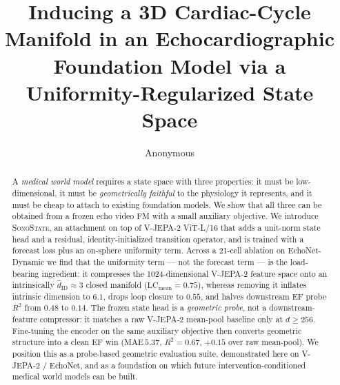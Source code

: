 \documentclass[runningheads]{llncs}
\newcommand{\sonostate}{\textsc{SonoState}\xspace}
\begin{document}
\title{Inducing a 3D Cardiac-Cycle Manifold in an Echocardiographic
Foundation Model via a Uniformity-Regularized State Space}

\author{Anonymous}

\maketitle

\begin{abstract}
A \emph{medical world model} requires a state space with three properties:
it must be low-dimensional, it must be \emph{geometrically faithful} to the
physiology it represents, and it must be cheap to attach to existing
foundation models. We show that all three can be obtained from a frozen
echo video FM with a small auxiliary objective. We introduce \sonostate,
an attachment on top of V-JEPA-2 ViT-L/16 that adds a unit-norm state head
and a residual, identity-initialized transition operator, and is trained
with a forecast loss plus an on-sphere uniformity term. Across a 21-cell
ablation on EchoNet-Dynamic we find that the uniformity term --- not the
forecast term --- is the load-bearing ingredient: it compresses the
1024-dimensional V-JEPA-2 feature space onto an intrinsically
$\widehat{d}_\mathrm{ID}\!\approx\!3$ closed manifold ($\mathrm{LC}_\mathrm{mean}\!=\!0.75$),
whereas removing it inflates intrinsic dimension to $6.1$, drops loop
closure to $0.55$, and halves downstream EF probe $R^2$ from $0.48$ to
$0.14$. The frozen state head is a \emph{geometric probe}, not a
downstream-feature compressor: it matches a raw V-JEPA-2 mean-pool
baseline only at $d\!\geq\!256$. Fine-tuning the encoder on the same
auxiliary objective then converts geometric structure into a clean EF
win (MAE\,$5.37$, $R^2{=}0.67$, $+0.15$ over raw mean-pool). We position this as a probe-based
geometric evaluation suite, demonstrated here on V-JEPA-2 / EchoNet,
and as a foundation on which future intervention-conditioned medical
world models can be built.
\end{abstract}
\end{document}

